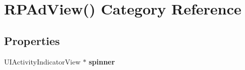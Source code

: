 \hypertarget{category_r_p_ad_view_07_08}{\section{R\-P\-Ad\-View() Category Reference}
\label{category_r_p_ad_view_07_08}
}
\subsection*{Properties}
\begin{DoxyCompactItemize}
\item 
\hypertarget{category_r_p_ad_view_07_08_acbd1fff307507b7062abbed6ed6b9c53}{U\-I\-Activity\-Indicator\-View $\ast$ {\bfseries spinner}}\label{category_r_p_ad_view_07_08_acbd1fff307507b7062abbed6ed6b9c53}

\end{DoxyCompactItemize}
